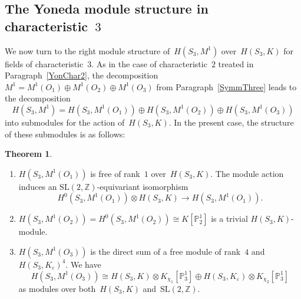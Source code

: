 \documentclass[12pt]{article}
\newcounter{num}
\theoremstyle{definition}
\newtheorem{Theorem}[Satz]{Theorem}
\theoremstyle{break}
\newcommand{\Z}{\mathbb{Z}}
\newcommand{\SL}{\mathrm{SL}}
\renewcommand{\P}{\mathbb{P}}
\renewcommand{\1}{\mathbbm{1}}
\renewcommand{\P}{\mathbb{P}}
\newcommand{\ot}{\mathbin{\otimes}}
\begin{document}
\subsection{The Yoneda module structure in characteristic~$3$} \label{YonChar3}
We now turn to the right module structure of~$H(S_3, M^1)$ over~$H(S_3, K)$ for fields of characteristic~$3$. As in the case of characteristic~$2$ treated in Paragraph~\ref{YonChar2}, the decomposition $M^1 = M^1(O_1) \oplus M^1(O_2) \oplus M^1(O_3)$ from Paragraph~\ref{SymmThree} leads to the decomposition
\[H(S_3, M^1) = H(S_3, M^1(O_1)) \oplus H(S_3, M^1(O_2)) \oplus H(S_3, M^1(O_3))\]
into submodules for the action of~$H(S_3, K)$. In the present case, the structure of these submodules is as follows:
\begin{Theorem} \label{ModStrucChar3}
\begin{enumerate}
\item
$H(S_3, M^1(O_1))$ is free of rank~$1$ over~$H(S_3, K)$. The module action induces an $\SL(2, \Z)$-equivariant isomorphism
\[H^0(S_3, M^1(O_1)) \ot H(S_3, K) \to H(S_3, M^1(O_1)).\]

\item
$H(S_3, M^1(O_2)) = H^0(S_3, M^1(O_2)) \cong K[\P^1_2]$ is a trivial $H(S_3, K)$-module.

\item
$H(S_3, M^1(O_3))$ is the direct sum of a free module of rank~$4$ and~$H(S_3, K_\varepsilon)^4$. We have
\[H(S_3, M^1(O_3)) \cong H(S_3, K) \ot K_{\chi_1}[\P_3^{1}] \oplus H(S_3, K_\varepsilon) \ot K_{\chi_2}[\P_3^{1}]\]
as modules over both~$H(S_3, K)$ and~$\SL(2, \Z)$.
\end{enumerate}
\end{Theorem}
\end{document}
